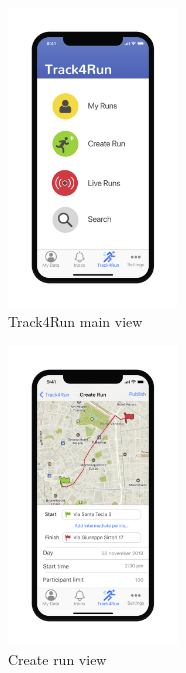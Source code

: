 \begin{figure}[H]
	\centering
	\includegraphics[width=0.4\textwidth]{./Pictures/Mockup/mobile/track4run.png}
	\captionsetup{skip=0pt}
	\caption{Track4Run main view}
\end{figure}

\begin{figure}[H]
	\centering
	\includegraphics[width=0.4\textwidth]{./Pictures/Mockup/mobile/create_run.png}
	\captionsetup{skip=0pt}
	\caption{Create run view}
\end{figure}

